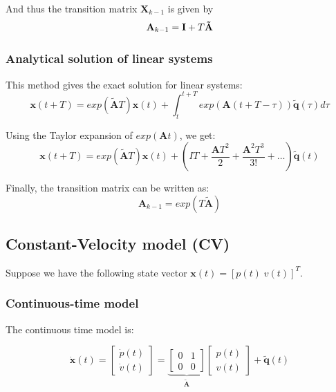 And thus the transition matrix $\mathbf{X}_{k-1}$ is given by 
\begin{equation}
    \mathbf{A}_{k-1} = \mathbf{I} + T \mathbf{\Tilde{A}}
\end{equation}

\subsubsection{Analytical solution of linear systems}

This method gives the exact solution for linear systems:
\begin{equation}
    \mathbf{x}(t+T) = exp(\mathbf{\tilde{A}}T)\mathbf{x}(t) + \int_t^{t+T} exp(\mathbf{A}(t+T-\tau)) \mathbf{\tilde{q}}(\tau) d\tau
\end{equation}

Using the Taylor expansion of $exp(\mathbf{A}t)$, we get:
\begin{equation}
    \mathbf{x}(t+T) = exp(\mathbf{\tilde{A}}T)\mathbf{x}(t) + \left( IT + \frac{\mathbf{A}T^2}{2} + \frac{\mathbf{A}^2T^3}{3!} + \dots \right) \mathbf{\tilde{q}}(t) \end{equation}

Finally, the transition matrix can be written as: 
\begin{equation}
    \mathbf{A}_{k-1} = exp(T \mathbf{\tilde{A}})
\end{equation}

\subsection{Constant-Velocity model (CV)}
Suppose we have the following state vector $\mathbf{x}(t) = [p(t) \; v(t)]^T$.

\subsubsection{Continuous-time model}
The continuous time model is:

\begin{equation}
    \mathbf{\dot{x}}(t) = 
    \left[ \begin{array}{c}
        \dot{p}(t) \\
        \dot{v}(t)
    \end{array}\right] = \underbrace{\left[\begin{array}{cc}
        0 & 1 \\
        0 & 0
    \end{array}\right]}_{\mathbf{\tilde{A}}} \left[\begin{array}{c}
        p(t) \\
        v(t)
    \end{array}\right] + \mathbf{\tilde{q}}(t)
\end{equation}

